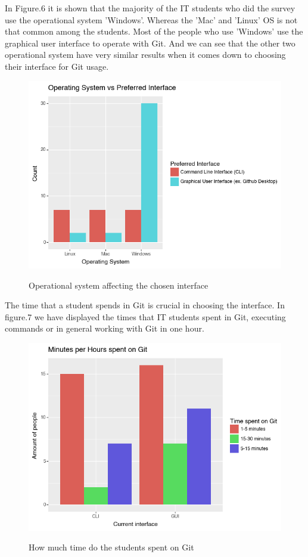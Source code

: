 \documentclass[]{report}
\begin{document}
	In Figure.6 it is shown that the majority of the IT students who did the survey use the operational system 'Windows'. Whereas the 'Mac' and 'Linux' OS is not that common among the students. Most of the people who use 'Windows' use the graphical user interface to operate with Git. And we can see that the other two operational system have very similar results when it comes down to choosing their interface for Git usage.
	
		\begin{figure}[H]
			\centering
			\includegraphics[width=0.75\linewidth]{OSAffectsInterface}\\
			\caption{Operational system affecting the chosen interface}
			\label{fig: 6}
		\end{figure}
		
		The time that a student spends in Git is crucial in choosing the interface. In figure.7 we have displayed the times that IT students spent in Git, executing commands or in general working with Git in one hour.
			\begin{figure}[H]
			\centering
			\includegraphics[width=0.75\linewidth]{TimeSpentGit}\\
			\caption{How much time do the students spent on Git}
			\label{fig: 7}
		\end{figure}
		
\end{document}
